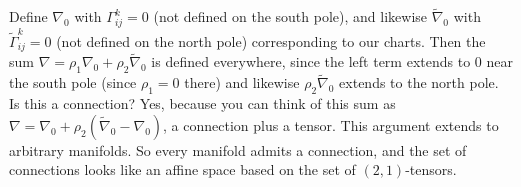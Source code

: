 Define $\nabla_0$ with $\Gamma _{ij}^{k}=0$ (not defined on the south pole), and likewise $\widetilde \nabla_0$ with $\widetilde \Gamma _{ij}^{k}=0$ (not defined on the north pole) corresponding to our charts. Then the sum $\nabla=\rho_1\nabla_0+\rho_2\widetilde \nabla_0$ is defined everywhere, since the left term extends to $0$ near the south pole (since $\rho_1=0$ there) and likewise $\rho_2\widetilde \nabla_0$ extends to the north pole. Is this a connection? Yes, because you can think of this sum as $\nabla = \nabla_0+\rho_2(\widetilde \nabla_0-\nabla_0)$, a connection plus a tensor. This argument extends to arbitrary manifolds. So every manifold admits a connection, and the set of connections looks like an affine space based on the set of $(2,1)$-tensors.

